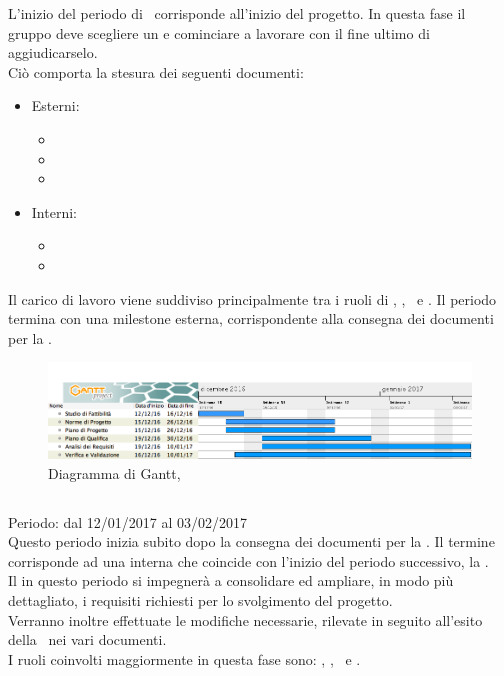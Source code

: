 L'inizio del periodo di \ARM\ corrisponde all'inizio del progetto. In questa fase il gruppo deve scegliere un  e cominciare a lavorare con il fine ultimo di aggiudicarselo.\\
Ciò comporta la stesura dei seguenti documenti:
 \begin{itemize}
 \item Esterni:
 	\begin{itemize}
 	 \item \AdR
 	 \item \PdP
	 \item \PdQ
 	\end{itemize}
 \item  Interni:
	\begin{itemize}
	\item \SdF
	\item \NdP
	\end{itemize} 
 \end{itemize}
 Il carico di lavoro viene suddiviso principalmente tra i ruoli di \An, \Am, \Ver\ e \Pm.
 Il periodo termina con una milestone esterna, corrispondente alla consegna dei documenti per la \RR.
 
 \begin{figure}[H]
	\centering 
	\includegraphics[scale=0.4]{Immagini/Gantt/ARM.png}
	\caption{Diagramma di Gantt, \ARM}
\end{figure}

\subsection{\ARD}
Periodo: dal 12/01/2017 al 03/02/2017 \\

Questo periodo inizia subito dopo la consegna dei documenti per la \RR. Il termine corrisponde ad una  interna che coincide con l'inizio del periodo successivo, la \PA.\\
Il  in questo periodo si impegnerà a consolidare ed ampliare, in modo più dettagliato, i requisiti richiesti per lo svolgimento del progetto.\\
Verranno inoltre effettuate le modifiche necessarie, rilevate in seguito all'esito della \RR\, nei vari documenti.\\
I ruoli coinvolti maggiormente in questa fase sono: \An, \Am, \Pm\ e \Ver.

